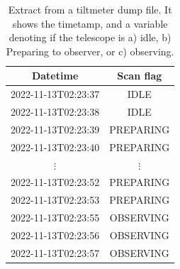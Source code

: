 \begin{table}[H]
    \centering
    \caption[Tiltmeter dump file]{Extract from a tiltmeter dump file. It shows the timetamp, and a variable denoting if the telescope is a) idle, b) Preparing to observer, or c) observing.}
    \begin{tabular}{cc}
        \toprule
        Datetime & Scan flag \\
        \midrule
        2022-11-13T02:23:37 & IDLE \\
        2022-11-13T02:23:38 & IDLE \\
        2022-11-13T02:23:39 & PREPARING \\
        2022-11-13T02:23:40 & PREPARING \\
        $\vdots$ & $\vdots$ \\ 
        2022-11-13T02:23:52 & PREPARING \\
        2022-11-13T02:23:53 & PREPARING \\
        2022-11-13T02:23:55 & OBSERVING \\
        2022-11-13T02:23:56 & OBSERVING \\
        2022-11-13T02:23:57 & OBSERVING \\
        \bottomrule
    \end{tabular}
    \label{tab:tiltmeter_example}
\end{table}